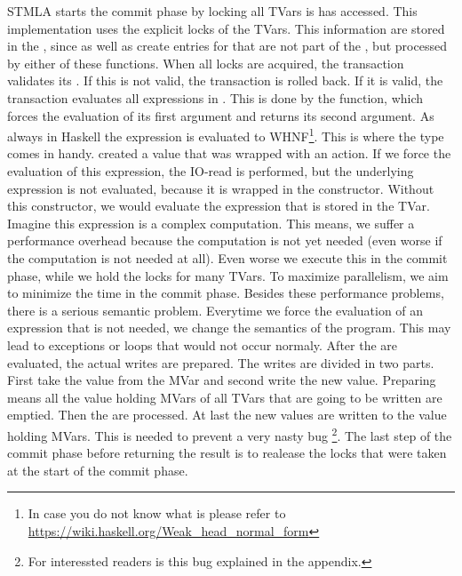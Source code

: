 STMLA starts the commit phase by locking all TVars is has accessed. This implementation 
uses the explicit locks of the TVars. This information are 
stored in the , since  as well as  create
entries for that are not part of the , but processed by either of these 
functions. When all locks are acquired, the transaction validates its .
If this is not valid, the transaction is rolled back.
If it is valid, the transaction evaluates all expressions in . This is done
by the  function, which forces the evaluation of its first argument and returns 
its second argument. As always in Haskell the expression is evaluated to WHNF\footnote{In 
case you do not know what  is please refer to 
\url{https://wiki.haskell.org/Weak_head_normal_form}}. This is where the  type 
comes in handy.  created a  value that was wrapped with an
 action. If we force the evaluation of this expression, the 
IO-read is performed, but the underlying expression is not evaluated, because it is wrapped 
in the  constructor. Without this constructor, we would evaluate the expression that 
is stored in the TVar. Imagine this expression is a complex computation. This means, we 
suffer a performance overhead because the computation is not yet needed (even worse if the
computation is not needed at all). 
Even worse we execute this in the commit phase, while we hold the locks for many TVars.
To maximize parallelism, we aim to minimize the time in the commit phase. Besides these
performance problems, there is a serious semantic problem. Everytime we force the 
evaluation of an expression that is not needed, we change the semantics of the program.
This may lead to exceptions or loops that would not occur normaly.
After the  are evaluated, the actual writes are prepared. The writes are 
divided in two parts. First take the value from the MVar and second write the new value.
Preparing means all the value holding MVars of all TVars that are going to be written
are emptied. Then the  are processed. At last the new values are written
to the value holding MVars. This is needed to prevent a very nasty bug \footnote{For 
interessted readers is this bug explained in the appendix.}. 
The last step of the commit phase before returning the result is to realease the locks
that were taken at the start of the commit phase.

